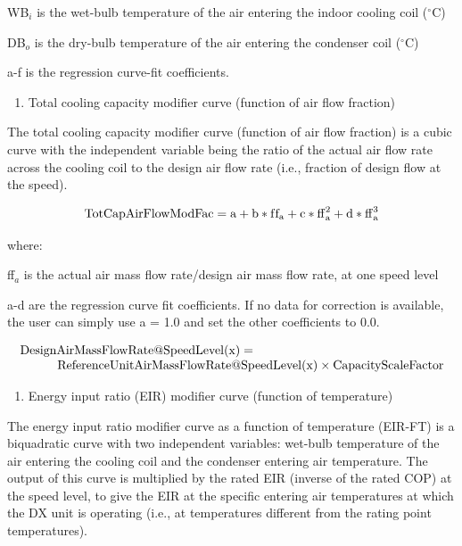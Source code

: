 WB\(_{i}\) is the wet-bulb temperature of the air entering the indoor cooling coil (\(^{\circ}\)C)

DB\(_{o}\) is the dry-bulb temperature of the air entering the condenser coil (\(^{\circ}\)C)

a-f is the regression curve-fit coefficients.

\begin{enumerate}
\def\labelenumi{\arabic{enumi})}
\setcounter{enumi}{1}
\item Total cooling capacity modifier curve (function of air flow fraction)
\end{enumerate}

The total cooling capacity modifier curve (function of air flow fraction) is a cubic curve with the independent variable being the ratio of the actual air flow rate across the cooling coil to the design air flow rate (i.e., fraction of design flow at the speed).

\begin{equation}
{\rm{TotCapAirFlowModFac}} = {\rm{a}} + {\rm{b*f}}{{\rm{f}}_{\rm{a}}} + {\rm{c*ff}}_{\rm{a}}^2 + {\rm{d*ff}}_{\rm{a}}^3
\end{equation}

where:

ff\(_{a}\) is the actual air mass flow rate/design air mass flow rate, at one speed level

a-d are the regression curve fit coefficients.  If no data for correction is available, the user can simply use a = 1.0 and set the other coefficients to 0.0.

\begin{equation}
  \begin{array}{l}
    {\rm{DesignAirMassFlowRate}}@{\rm{SpeedLevel}}({\rm{x}}) = {\rm{}}\\\quad \quad \quad {\rm{ReferenceUnitAirMassFlowRate}}@{\rm{SpeedLevel}}({\rm{x}}) \times {\rm{CapacityScaleFactor}}
  \end{array}
\end{equation}

\begin{enumerate}
\def\labelenumi{\arabic{enumi})}
\setcounter{enumi}{2}
\tightlist
\item
  Energy input ratio (EIR) modifier curve (function of temperature)
\end{enumerate}

The energy input ratio modifier curve as a function of temperature (EIR-FT) is a biquadratic curve with two independent variables: wet-bulb temperature of the air entering the cooling coil and the condenser entering air temperature. The output of this curve is multiplied by the rated EIR (inverse of the rated COP) at the speed level, to give the EIR at the specific entering air temperatures at which the DX unit is operating (i.e., at temperatures different from the rating point temperatures).

